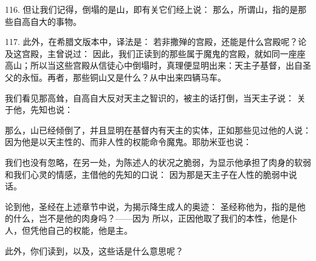116. 但让我们记得，倒塌的是山，即有关它们经上说： 那么，所谓山，指的是那些自高自大的事物。\par

117. 此外，在希腊文版本中，译法是： 若非撒殚的宫殿，还能是什么宫殿呢？论及这宫殿，主曾说过： 因此，我们正读到的那些属于魔鬼的宫殿，就如同一座座高山；所以当这些宫殿从信徒心中倒塌时，真理便显明出来：天主子基督，出自圣父的永恒。再者，那些铜山又是什么？从中出来四辆马车。\par

我们看见那高耸，自高自大反对天主之智识的，被主的话打倒，当天主子说：  关于他，先知也说：\par

那么，山已经倾倒了，并且显明在基督内有天主的实体，正如那些见过他的人说：  因为他是以天主性的、而非人性的权能命令魔鬼。耶肋米亚也说：\par

我们也没有忽略，在另一处，为陈述人的状况之脆弱，为显示他承担了肉身的软弱和我们心灵的情感，主借他的先知的口说： 因为那是天主子在人性的脆弱中说话。\par

论到他，圣经在上述章节中说，为揭示降生成人的奥迹： 圣经称他为，指的是他的什么，岂不是他的肉身吗？——因为  所以，正因他取了我们的本性，他是仆人，但凭他自己的权能，他是主。\par

此外，你们读到，以及，这些话是什么意思呢？\par

\par

